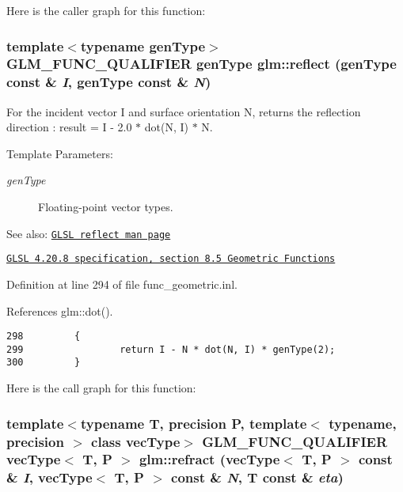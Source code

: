 Here is the caller graph for this function:\hypertarget{group__core__func__geometric_gc973ce2bc49f749a469d3ed2e2ac5a54}{
\subsubsection[reflect]{\setlength{\rightskip}{0pt plus 5cm}template$<$typename genType$>$ GLM\_\-FUNC\_\-QUALIFIER genType glm::reflect (genType const \& {\em I}, \/  genType const \& {\em N})}}
\label{group__core__func__geometric_gc973ce2bc49f749a469d3ed2e2ac5a54}


For the incident vector I and surface orientation N, returns the reflection direction : result = I - 2.0 $\ast$ dot(N, I) $\ast$ N.

\begin{Desc}
\item[Template Parameters:]
\begin{description}
\item[{\em genType}]Floating-point vector types.\end{description}
\end{Desc}
\begin{Desc}
\item[See also:]\href{http://www.opengl.org/sdk/docs/manglsl/xhtml/reflect.xml}{\tt GLSL reflect man page} 

\href{http://www.opengl.org/registry/doc/GLSLangSpec.4.20.8.pdf}{\tt GLSL 4.20.8 specification, section 8.5 Geometric Functions} \end{Desc}


Definition at line 294 of file func\_\-geometric.inl.

References glm::dot().

\begin{Code}\begin{verbatim}298         {
299                 return I - N * dot(N, I) * genType(2);
300         }
\end{verbatim}
\end{Code}




Here is the call graph for this function:\hypertarget{group__core__func__geometric_g2020e01c134ebe03c1690306ff93af53}{
\subsubsection[refract]{\setlength{\rightskip}{0pt plus 5cm}template$<$typename T, precision P, template$<$ typename, precision $>$ class vecType$>$ GLM\_\-FUNC\_\-QUALIFIER vecType$<$ T, P $>$ glm::refract (vecType$<$ T, P $>$ const \& {\em I}, \/  vecType$<$ T, P $>$ const \& {\em N}, \/  T const \& {\em eta})}}
\label{group__core__func__geometric_g2020e01c134ebe03c1690306ff93af53}


